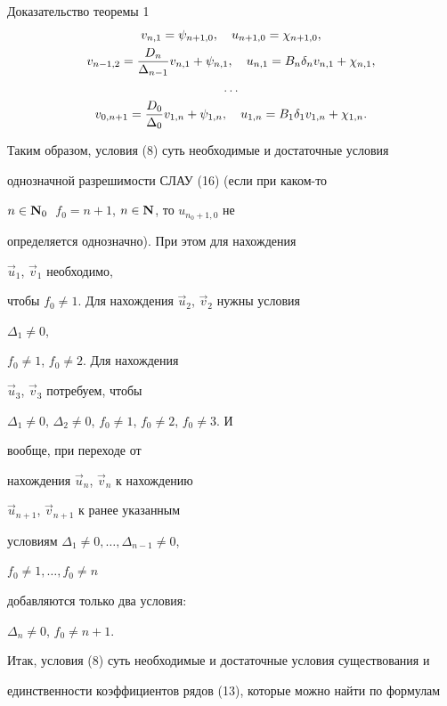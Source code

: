\begin{pf*}{Доказательство теоремы 1}
\begin{gather}
v_{n,1}=\psi_{n+1,0},\quad u_{n+1,0}=\chi_{n+1,0},\notag\\


v_{n-1,2}=\frac{D_n}{\Delta_{n-1}}v_{n,1}+\psi_{n,1},\quad


u_{n,1}=B_n\delta_nv_{n,1}+\chi_{n,1},\\


\dots\notag\\


v_{0,n+1}=\frac{D_0}{\Delta_0}v_{1,n}+\psi_{1,n},\quad


u_{1,n}=B_1\delta_1v_{1,n}+\chi_{1,n}.\notag


\end{gather}





Таким образом, условия (8) суть необходимые и достаточные условия


однозначной разрешимости СЛАУ (16) (если при каком-то


$n\in\bold N_0\;$ $f_0=n+1$, $n\in\bold N$, то $u_{n_0+1,0}$ не


определяется однозначно). При этом для нахождения


$\Vec u_1$, $\Vec v_1$ необходимо,


чтобы $f_0\ne 1$. Для нахождения $\Vec u_2$, $\Vec v_2$ нужны условия


$\Delta_1\ne 0$,


$f_0\ne 1$, $f_0\ne 2$. Для нахождения


$\Vec u_3$, $\Vec v_3$ потребуем, чтобы


$\Delta_1\ne 0$, $\Delta_2\ne 0$, $f_0\ne 1$, $f_0\ne 2$, $f_0\ne 3$. И


вообще, при переходе от


нахождения $\Vec u_n$, $\Vec v_n$ к нахождению


$\Vec u_{n+1}$, $\Vec v_{n+1}$ к ранее указанным


условиям $\Delta_1\ne 0,\dotsc,\Delta_{n-1}\ne 0$,


$f_0\ne 1,\dotsc,f_0\ne n$


добавляются только два условия:


$\Delta_n\ne 0$, $f_0\ne n+1$.





Итак, условия (8) суть необходимые и достаточные условия существования и


единственности коэффициентов рядов (13), которые можно найти по формулам



\end{pf*}
